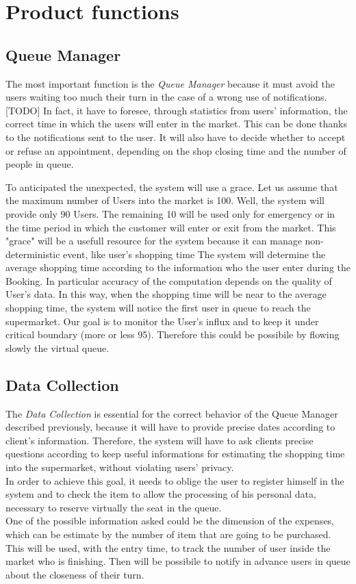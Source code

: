 \section{Product functions}
\subsection{Queue Manager}
The most important function is the \textit{Queue Manager} because it must avoid the users waiting too much their turn in the case of a wrong use of notifications. [TODO]
In fact, it have to foresee, through statistics from users’ information, the correct time in which the users will enter in the market. This can be done thanks to the notifications sent to the user.
It will also have to decide whether to accept or refuse an appointment, depending on the shop closing time and the number of people in queue. 



To anticipated the unexpected, the system will use a grace.
Let us assume that the maximum number of Users into the market is 100. Well, the system will provide only 90 Users.
The remaining 10 will be used only for emergency or in the time period in which the customer will enter or exit from the market.
This "grace" will be a usefull resource for the system because it can manage non-deterministic event, like user's shopping time %
The system will determine the average shopping time according to the information who the user enter during the Booking.
In particular accuracy of the computation depends on the quality of User's data.
In this way, when the shopping time will be near to the average shopping time, the system will notice the first user in queue to reach the supermarket.  
Our goal is to monitor the User's influx and to keep it under critical boundary (more or less 95). Therefore this could be possibile by flowing slowly the virtual queue.

\subsection{Data Collection}
The \textit{Data Collection} is essential for the correct behavior of the Queue Manager described previously, because it will have to provide precise dates according to client’s information. 
Therefore, the system will have to ask clients precise questions according to keep useful informations for estimating the shopping time into the supermarket, without violating users’ privacy. 
\\
In order to achieve this goal, it needs to oblige the user to register himself in the system and to check the item to allow the processing of his personal data, necessary to reserve virtually the seat in the queue.
\\
One of the possible information asked could be the dimension of the expenses, which can be estimate by the number of item that are going to be purchased. This will be used, with the entry time, to track the number of user inside the market who is finishing. Then will be possibile to notify in advance users in queue about the closeness of their turn.

